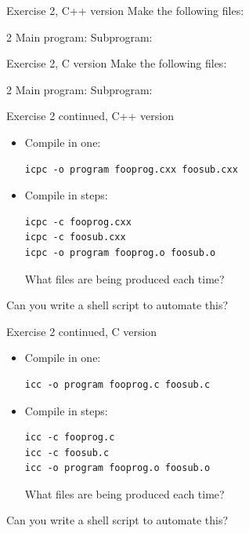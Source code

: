 \documentclass[11pt,headernav]{beamer}
\begin{document}
\begin{numberedframe}{Exercise 2, C++ version}
  \label{sl-tut:compile3cxx}
\begingroup \footnotesize
Make the following files:
\begin{multicols}{2}
  Main program: 
  \columnbreak
  Subprogram: 
\end{multicols}
\endgroup
\end{numberedframe}

\begin{numberedframe}{Exercise 2, C version}
  \label{sl-tut:compile3c}
\begingroup \footnotesize
Make the following files:
\begin{multicols}{2}
  Main program: 
  \columnbreak
  Subprogram: 
\end{multicols}
\endgroup
\end{numberedframe}

\begin{numberedframe}{Exercise 2 continued, C++ version}
  \begin{itemize}
  \item Compile in one:
\begin{verbatim}
icpc -o program fooprog.cxx foosub.cxx
\end{verbatim}
\item Compile in steps:
\begin{verbatim}
icpc -c fooprog.cxx
icpc -c foosub.cxx
icpc -o program fooprog.o foosub.o
\end{verbatim}
What files are being produced each time?
  \end{itemize}
Can you write a shell script to automate this?  
\end{numberedframe}

\begin{numberedframe}{Exercise 2 continued, C version}
  \begin{itemize}
  \item Compile in one:
\begin{verbatim}
icc -o program fooprog.c foosub.c
\end{verbatim}
\item Compile in steps:
\begin{verbatim}
icc -c fooprog.c
icc -c foosub.c
icc -o program fooprog.o foosub.o
\end{verbatim}
What files are being produced each time?
  \end{itemize}
Can you write a shell script to automate this?  
\end{numberedframe}
\end{document}
